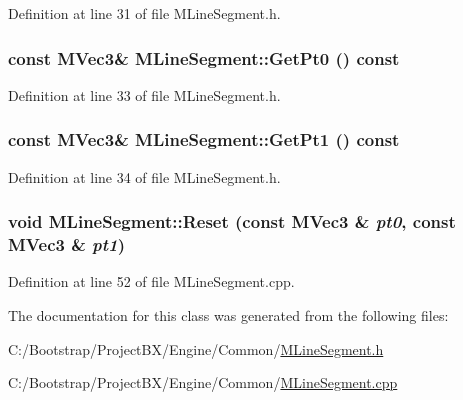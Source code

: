 Definition at line 31 of file MLineSegment.h.\hypertarget{class_m_line_segment_1e807174673d4e2a603434ada6097c2d}{
\subsubsection[{GetPt0}]{\setlength{\rightskip}{0pt plus 5cm}const {\bf MVec3}\& MLineSegment::GetPt0 () const}}
\label{class_m_line_segment_1e807174673d4e2a603434ada6097c2d}




Definition at line 33 of file MLineSegment.h.\hypertarget{class_m_line_segment_2b714095316270b8763c51a8f799e68f}{
\subsubsection[{GetPt1}]{\setlength{\rightskip}{0pt plus 5cm}const {\bf MVec3}\& MLineSegment::GetPt1 () const}}
\label{class_m_line_segment_2b714095316270b8763c51a8f799e68f}




Definition at line 34 of file MLineSegment.h.\hypertarget{class_m_line_segment_ce31a90c5d0f400ff1bf9e8f5ca6b0ea}{
\subsubsection[{Reset}]{\setlength{\rightskip}{0pt plus 5cm}void MLineSegment::Reset (const {\bf MVec3} \& {\em pt0}, \/  const {\bf MVec3} \& {\em pt1})}}
\label{class_m_line_segment_ce31a90c5d0f400ff1bf9e8f5ca6b0ea}




Definition at line 52 of file MLineSegment.cpp.

The documentation for this class was generated from the following files:\begin{CompactItemize}
\item 
C:/Bootstrap/ProjectBX/Engine/Common/\hyperlink{_m_line_segment_8h}{MLineSegment.h}\item 
C:/Bootstrap/ProjectBX/Engine/Common/\hyperlink{_m_line_segment_8cpp}{MLineSegment.cpp}\end{CompactItemize}
